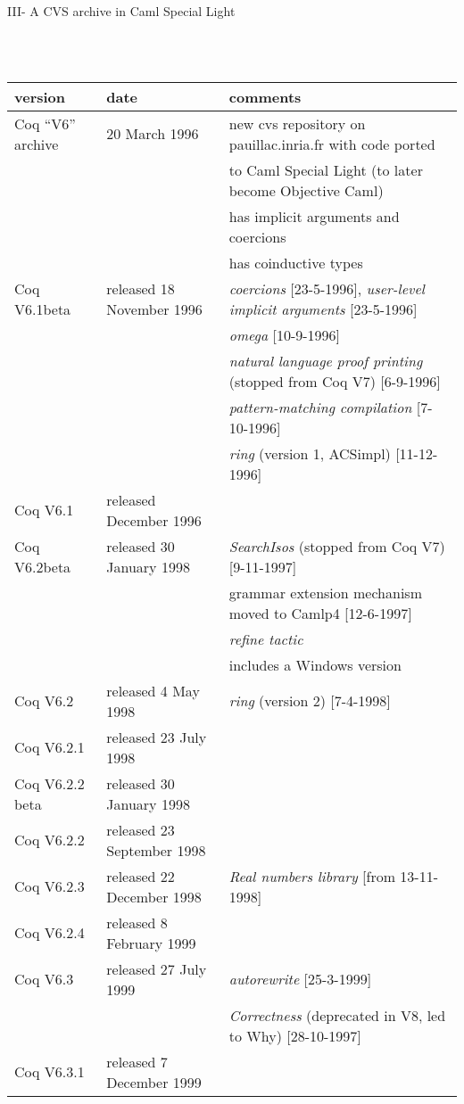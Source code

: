 \documentclass[a4paper]{book}
\newcommand{\feature}[1]{{\em #1}}
\begin{document}
\centerline{III- A CVS archive in Caml Special Light}
\mbox{}\\
\mbox{}\\
\begin{tabular}{l|l|l}
version & date & comments \\
\hline
Coq ``V6'' archive & 20 March 1996 & new cvs repository on pauillac.inria.fr with code ported \\
 & & to Caml Special Light (to later become Objective Caml)\\
 & & has implicit arguments and coercions\\
 & & has coinductive types\\

Coq V6.1beta& released 18 November 1996 & \feature{coercions} [23-5-1996], \feature{user-level implicit arguments} [23-5-1996]\\
 & & \feature{omega} [10-9-1996] \\
 & & \feature{natural language proof printing} (stopped from Coq V7) [6-9-1996]\\
 & & \feature{pattern-matching compilation} [7-10-1996]\\
 & & \feature{ring} (version 1, ACSimpl) [11-12-1996]\\

Coq V6.1& released December 1996 & \\

Coq V6.2beta& released 30 January 1998 & %
      \feature{SearchIsos} (stopped from Coq V7) [9-11-1997]\\
  & & grammar extension mechanism moved to Camlp4 [12-6-1997]\\
  & & \feature{refine tactic}\\
  & & includes a Windows version\\

Coq V6.2& released 4 May 1998 & %
  \feature{ring} (version 2) [7-4-1998] \\

Coq V6.2.1& released 23 July 1998\\

Coq V6.2.2 beta& released 30 January 1998\\

Coq V6.2.2& released 23 September 1998\\

Coq V6.2.3& released 22 December 1998 & \feature{Real numbers library} [from 13-11-1998] \\

Coq V6.2.4& released 8 February 1999\\

Coq V6.3& released 27 July 1999 & \feature{autorewrite} [25-3-1999]\\
 & & \feature{Correctness} (deprecated in V8, led to Why) [28-10-1997]\\

Coq V6.3.1& released 7 December 1999\\
\end{tabular}
\medskip
\bigskip
\end{document}
